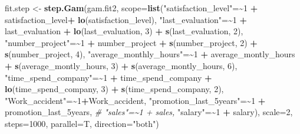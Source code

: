 \documentclass[
  11pt,
]{article}
\newenvironment{Shaded}{\begin{snugshade}}{\end{snugshade}}
\newcommand{\AttributeTok}[1]{\textcolor[rgb]{0.13,0.29,0.53}{#1}}
\newcommand{\CommentTok}[1]{\textcolor[rgb]{0.56,0.35,0.01}{\textit{#1}}}
\newcommand{\DecValTok}[1]{\textcolor[rgb]{0.00,0.00,0.81}{#1}}
\newcommand{\ErrorTok}[1]{\textcolor[rgb]{0.64,0.00,0.00}{\textbf{#1}}}
\newcommand{\FunctionTok}[1]{\textcolor[rgb]{0.13,0.29,0.53}{\textbf{#1}}}
\newcommand{\NormalTok}[1]{#1}
\newcommand{\OtherTok}[1]{\textcolor[rgb]{0.56,0.35,0.01}{#1}}
\newcommand{\SpecialCharTok}[1]{\textcolor[rgb]{0.81,0.36,0.00}{\textbf{#1}}}
\newcommand{\StringTok}[1]{\textcolor[rgb]{0.31,0.60,0.02}{#1}}
\begin{document}
\begin{Shaded}
\begin{Highlighting}[]
\NormalTok{fit.step }\OtherTok{\textless{}{-}} \FunctionTok{step.Gam}\NormalTok{(gam.fit2, }\AttributeTok{scope=}\FunctionTok{list}\NormalTok{(}\StringTok{"satisfaction\_level"}\OtherTok{=}\ErrorTok{\textasciitilde{}}\DecValTok{1} \SpecialCharTok{+}\NormalTok{ satisfaction\_level}\SpecialCharTok{+}
                    \FunctionTok{lo}\NormalTok{(satisfaction\_level),}
\StringTok{"last\_evaluation"}\OtherTok{=}\ErrorTok{\textasciitilde{}}\DecValTok{1} \SpecialCharTok{+}\NormalTok{ last\_evaluation }\SpecialCharTok{+} \FunctionTok{lo}\NormalTok{(last\_evaluation, }\DecValTok{3}\NormalTok{) }\SpecialCharTok{+} \FunctionTok{s}\NormalTok{(last\_evaluation, }\DecValTok{2}\NormalTok{), }
\StringTok{"number\_project"}\OtherTok{=}\ErrorTok{\textasciitilde{}}\DecValTok{1} \SpecialCharTok{+}\NormalTok{ number\_project }\SpecialCharTok{+} \FunctionTok{s}\NormalTok{(number\_project, }\DecValTok{2}\NormalTok{) }\SpecialCharTok{+} \FunctionTok{s}\NormalTok{(number\_project, }\DecValTok{4}\NormalTok{),}
    \StringTok{"average\_monthly\_hours"}\OtherTok{=}\ErrorTok{\textasciitilde{}}\DecValTok{1} \SpecialCharTok{+}\NormalTok{ average\_montly\_hours }\SpecialCharTok{+} \FunctionTok{s}\NormalTok{(average\_montly\_hours, }\DecValTok{3}\NormalTok{) }\SpecialCharTok{+}
         \FunctionTok{s}\NormalTok{(average\_montly\_hours, }\DecValTok{6}\NormalTok{),}
           \StringTok{"time\_spend\_company"}\OtherTok{=}\ErrorTok{\textasciitilde{}}\DecValTok{1} \SpecialCharTok{+}\NormalTok{ time\_spend\_company }\SpecialCharTok{+} \FunctionTok{lo}\NormalTok{(time\_spend\_company, }\DecValTok{3}\NormalTok{) }\SpecialCharTok{+}
            \FunctionTok{s}\NormalTok{(time\_spend\_company, }\DecValTok{2}\NormalTok{), }
           \StringTok{"Work\_accident"}\OtherTok{=}\ErrorTok{\textasciitilde{}}\DecValTok{1}\SpecialCharTok{+}\NormalTok{Work\_accident, }
           \StringTok{"promotion\_last\_5years"}\OtherTok{=}\ErrorTok{\textasciitilde{}}\DecValTok{1} \SpecialCharTok{+}\NormalTok{ promotion\_last\_5years,}
           \CommentTok{\# "sales"=\textasciitilde{}1 + sales,}
           \StringTok{"salary"}\OtherTok{=}\ErrorTok{\textasciitilde{}}\DecValTok{1} \SpecialCharTok{+}\NormalTok{ salary),}
           \AttributeTok{scale=}\DecValTok{2}\NormalTok{, }\AttributeTok{steps=}\DecValTok{1000}\NormalTok{, }\AttributeTok{parallel=}\NormalTok{T, }\AttributeTok{direction=}\StringTok{"both"}\NormalTok{)}
\end{Highlighting}
\end{Shaded}
\end{document}
